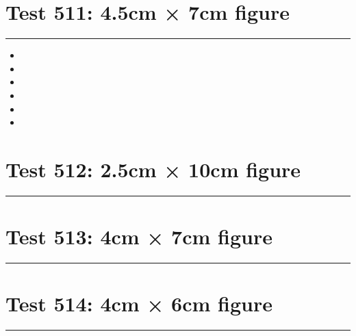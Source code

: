 \documentclass[a4paper,11pt]{article}
\begin{document}
\section*{Test 511: 4.5cm × 7cm figure}
\begin{swarmwrap}%
  \begin{minipage}[t]{4cm}
    \centering
    \rule{\linewidth}{7cm}
  \end{minipage}%
\end{swarmwrap}
\begin{itemize}
  \item \swarmwrapnext\lipsum[133][1-4]
  \item \lipsum[135][1-3]
  \item \lipsum[136][1-3]
  \item \lipsum[137][1-3]
  \item \lipsum[138][1-3]
  \item \lipsum[139][1-3]
\end{itemize}
\section*{Test 512: 2.5cm × 10cm figure}
\begin{swarmwrap}%
  \begin{minipage}[t]{2cm}
    \centering
    \rule{\linewidth}{10cm}
  \end{minipage}%
\end{swarmwrap}%
\swarmwrapnext
\lipsum[85]
\lipsum[86]
\lipsum[87]
\lipsum[88]
\section*{Test 513: 4cm × 7cm figure}
\begin{swarmwrap}%
  \begin{minipage}[t]{4cm}
    \centering
    \rule{\linewidth}{7cm}
  \end{minipage}%
\end{swarmwrap}%
\swarmwrapnext
\lipsum[102]
\lipsum[103]
\lipsum[104]
\lipsum[105]
\section*{Test 514: 4cm × 6cm figure}
\begin{swarmwrap}%
  \begin{minipage}[t]{4cm}
    \centering
    \rule{\linewidth}{6cm}
  \end{minipage}%
\end{swarmwrap}%
\swarmwrapnext
\lipsum[131]
\lipsum[132]
\lipsum[133]
\lipsum[134]
\lipsum[135]
\end{document}
